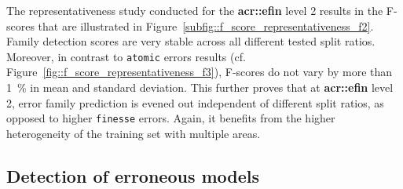         The representativeness study conducted for the \textbf{\gls{acr::efin}} level 2 results in the F-scores that are illustrated in Figure~\ref{subfig::f_score_representativeness_f2}.
        Family detection scores are very stable across all different tested split ratios.
        Moreover, in contrast to \texttt{atomic} errors results (cf. Figure~\ref{fig::f_score_representativeness_f3}), F-scores do not vary by more than \SI{1}{\percent} in mean and standard deviation.
        This further proves that at \textbf{\gls{acr::efin}} level 2, error family prediction is evened out independent of different split ratios, as opposed to higher \texttt{finesse} errors.
        Again, it benefits from the higher heterogeneity of the training set with multiple areas.
    
    \subsection{Detection of erroneous models}
        \label{subsec::more_experiments::finesse::1}
